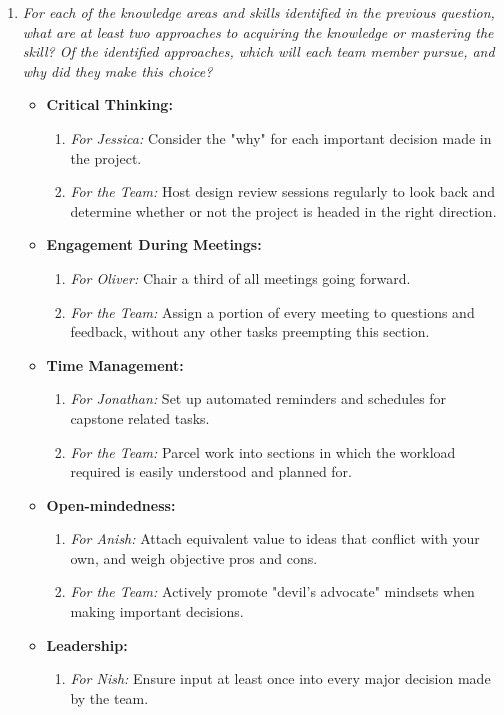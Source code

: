\documentclass[12pt, titlepage]{article}
\begin{document}
\begin{enumerate}
  \item \textit{For each of the knowledge areas and skills identified in the previous
        question, what are at least two approaches to acquiring the knowledge or
        mastering the skill?  Of the identified approaches, which will each team
        member pursue, and why did they make this choice?}
	\begin{itemize}
	\item \textbf{Critical Thinking:}
		\begin{enumerate}
		\item \textit{For Jessica:} Consider the "why" for each important decision made in the project.
		\item \textit{For the Team:} Host design review sessions regularly to look back and determine whether or not the project is headed in the right direction.
		\end{enumerate}
	\item \textbf{Engagement During Meetings:}
		\begin{enumerate}
		\item \textit{For Oliver:} Chair a third of all meetings going forward.
		\item \textit{For the Team:} Assign a portion of every meeting to questions and feedback, without any other tasks preempting this section.
		\end{enumerate}
	\item \textbf{Time Management:}
		\begin{enumerate}
		\item \textit{For Jonathan:} Set up automated reminders and schedules for capstone related tasks.
		\item \textit{For the Team:} Parcel work into sections in which the workload required is easily understood and planned for.
		\end{enumerate}
	\item \textbf{Open-mindedness:}
		\begin{enumerate}
		\item \textit{For Anish:} Attach equivalent value to ideas that conflict with your own, and weigh objective pros and cons.
		\item \textit{For the Team:} Actively promote "devil's advocate" mindsets when making important decisions.
		\end{enumerate}
	\item \textbf{Leadership:}
		\begin{enumerate}
		\item \textit{For Nish:} Ensure input at least once into every major decision made by the team.

\end{enumerate}
\end{itemize}
\end{enumerate}
\end{document}
